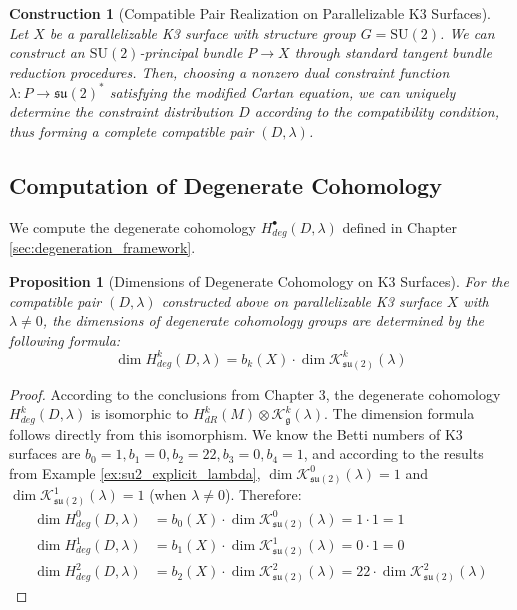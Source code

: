 \documentclass[a4paper,12pt]{extarticle}
\theoremstyle{plain}
\newtheorem{proposition}[theorem]{Proposition}
\newtheorem{construction}[theorem]{Construction}
\theoremstyle{definition}
\begin{document}
\begin{construction}[Compatible Pair Realization on Parallelizable K3 Surfaces]
\label{const:k3-compatible-pair}
Let $X$ be a parallelizable K3 surface with structure group $G = \mathrm{SU}(2)$. We can construct an $\mathrm{SU}(2)$-principal bundle $P \to X$ through standard tangent bundle reduction procedures. Then, choosing a nonzero dual constraint function $\lambda: P \to \mathfrak{su}(2)^*$ satisfying the modified Cartan equation, we can uniquely determine the constraint distribution $D$ according to the compatibility condition, thus forming a complete compatible pair $(D, \lambda)$.
\end{construction}

\subsection{Computation of Degenerate Cohomology}
\label{sec:degenerate_cohomology_k3}

We compute the degenerate cohomology $H_{deg}^{\bullet}(D,\lambda)$ defined in Chapter \ref{sec:degeneration_framework}.

\begin{proposition}[Dimensions of Degenerate Cohomology on K3 Surfaces]
\label{prop:k3-degenerate-cohomology}
For the compatible pair $(D,\lambda)$ constructed above on parallelizable K3 surface $X$ with $\lambda \neq 0$, the dimensions of degenerate cohomology groups are determined by the following formula:
$$\dim H_{deg}^{k}(D,\lambda) = b_k(X) \cdot \dim \mathcal{K}_{\mathfrak{su}(2)}^{k}(\lambda)$$
\end{proposition}

\begin{proof}
According to the conclusions from Chapter 3, the degenerate cohomology $H_{deg}^{k}(D,\lambda)$ is isomorphic to $H_{dR}^{k}(M) \otimes \mathcal{K}_{\mathfrak{g}}^{k}(\lambda)$. The dimension formula follows directly from this isomorphism. We know the Betti numbers of K3 surfaces are $b_0=1, b_1=0, b_2=22, b_3=0, b_4=1$, and according to the results from Example \ref{ex:su2_explicit_lambda}, $\dim \mathcal{K}_{\mathfrak{su}(2)}^{0}(\lambda)=1$ and $\dim \mathcal{K}_{\mathfrak{su}(2)}^{1}(\lambda)=1$ (when $\lambda \neq 0$). Therefore:
\begin{align*}
\dim H_{deg}^{0}(D,\lambda) &= b_0(X) \cdot \dim \mathcal{K}_{\mathfrak{su}(2)}^{0}(\lambda) = 1 \cdot 1 = 1 \\
\dim H_{deg}^{1}(D,\lambda) &= b_1(X) \cdot \dim \mathcal{K}_{\mathfrak{su}(2)}^{1}(\lambda) = 0 \cdot 1 = 0 \\
\dim H_{deg}^{2}(D,\lambda) &= b_2(X) \cdot \dim \mathcal{K}_{\mathfrak{su}(2)}^{2}(\lambda) = 22 \cdot \dim \mathcal{K}_{\mathfrak{su}(2)}^{2}(\lambda)
\end{align*}
\end{proof}
\end{document}
